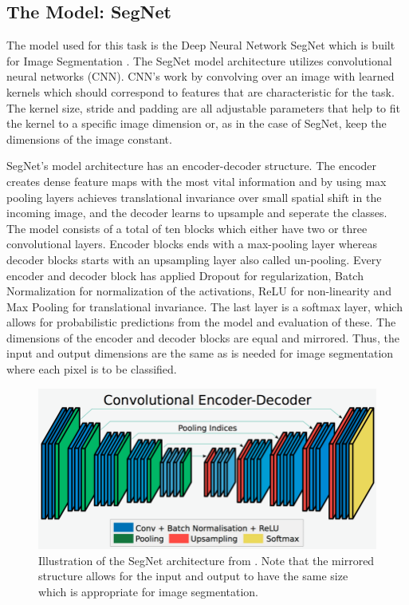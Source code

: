\documentclass{article}
\begin{document}
\subsection{The Model: SegNet}
%
The model used for this task is the Deep Neural Network SegNet which is built for Image Segmentation \cite{seg}.
The SegNet model architecture utilizes convolutional neural networks (CNN). 
CNN's work by convolving over an image with learned kernels which should correspond to features that are characteristic for the task.
The kernel size, stride and padding are all adjustable parameters that help to fit the kernel to a specific image dimension or, as in the case of SegNet, keep the dimensions of the image constant. 


SegNet's model architecture has an encoder-decoder structure. The encoder creates dense feature maps with the most vital information and by using max pooling layers achieves translational invariance over small spatial shift in the incoming image, and the decoder learns to upsample and seperate the classes.
The model consists of a total of ten blocks which either have two or three convolutional layers. Encoder blocks ends with a max-pooling layer whereas decoder blocks starts with an upsampling layer also called  un-pooling.
Every encoder and decoder block has applied Dropout for regularization, Batch Normalization for normalization of the activations, ReLU for non-linearity and Max Pooling for translational invariance.
The last layer is a softmax layer, which allows for probabilistic predictions from the model and evaluation of these. The dimensions of the encoder and decoder blocks are equal and mirrored. Thus, the input and output dimensions are the same as is needed for image segmentation where each pixel is to be classified.
\begin{figure}[!h]
	\centering
	\includegraphics[width=0.8\linewidth]{../../poster/Encoder-Decoder2}
	\caption{Illustration of the SegNet architecture from \cite{seg}. Note that the mirrored structure allows for the input and output to have the same size which is appropriate for image segmentation.}
	\label{fig:encoder-decoder2}
\end{figure}
\end{document}

